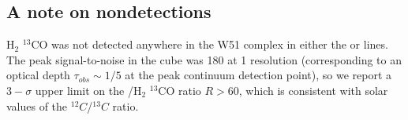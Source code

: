 
% 


\subsection{A note on nondetections}
H$_2$ $^{13}$CO was not detected anywhere in the W51 complex in either the
\oneone or \twotwo lines.  The peak signal-to-noise in the \formaldehyde \oneone cube was
180 at 1 \kms resolution (corresponding to an optical depth $\tau_{obs}\sim1/5$ at
the peak continuum detection point), so we report a $3-\sigma$ upper limit on the
\formaldehyde/H$_2$ $^{13}$CO ratio $R>60$, which is consistent with solar
values of the $^{12}C$/$^{13}C$
ratio.

